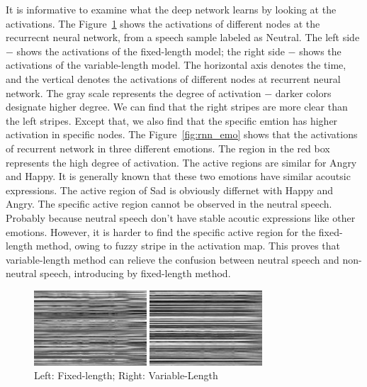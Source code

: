 \documentclass[a4paper]{article}
\begin{document}
It is informative to examine what the deep network learns by looking at the activations. The Figure~\ref{fig:rnn_com} shows the activations of different nodes at the recurrecnt neural network, from a speech sample labeled as Neutral. The left side $-$ shows the activations of the fixed-length model; the right side $-$ shows the activations of the variable-length model. The horizontal axis denotes the time, and the vertical denotes the activations of different nodes at recurrent neural network. The gray scale represents the degree of activation $-$ darker colors designate higher degree. We can find that the right stripes are more clear than the left stripes. Except that, we also find that the specific emtion has higher activation in specific nodes. The Figure~\ref{fig:rnn_emo} shows that the activations of recurrent network in three different emotions. The region in the red box represents the high degree of activation. The active regions are similar for Angry and Happy. It is generally known that these two emotions have similar acoutsic expressions. The active region of Sad is obviously differnet with Happy and Angry. The specific active region cannot be observed in the neutral speech. Probably because neutral speech don't have stable acoutic expressions like other emotions. However, it is harder to find the specific active region for the fixed-length method, owing to fuzzy stripe in the activation map. This proves that variable-length method can relieve the confusion between neutral speech and non-neutral speech, introducing by fixed-length method. 

\begin{figure}[htb]
    \begin{minipage}[b]{.45\linewidth}
      \centering
      \centerline{\includegraphics[width=4.2cm]{rnn_out_const_neu_comp}}
    \end{minipage}
    \hfill
    \begin{minipage}[b]{0.45\linewidth}
      \centering
      \centerline{\includegraphics[width=4.2cm]{rnn_out_var_neu_comp}}
    \end{minipage}
    \caption{Left: Fixed-length; Right: Variable-Length}
    \label{fig:rnn_com}
\end{figure}
\end{document}
